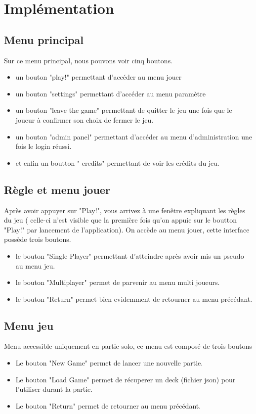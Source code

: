\section{Implémentation}
\subsection{Menu principal}
Sur ce menu principal, nous pouvons voir cinq boutons. 
\begin{itemize}
	\item un bouton "play!" permettant d'accéder au menu jouer
	\item un bouton "settings" permettant d'accéder au menu paramètre
	\item un bouton "leave the game" permettant de quitter le jeu une fois que le joueur à confirmer son choix de 
		fermer le jeu.
	\item un bouton "admin panel" permettant d'accéder au menu d'administration une fois le login réussi.
	\item et enfin un boutton " credits" permettant de voir les crédits du jeu.
\end{itemize}

\subsection{Règle et menu jouer}
Après avoir appuyer sur "Play!", vous arrivez à une fenêtre expliquant les règles du jeu ( celle-ci n'est 
visible que la première fois qu'on appuie sur le boutton "Play!" par lancement de l'application). On accède 
au menu jouer, cette interface possède trois boutons. 
\begin{itemize}
	\item le bouton "Single Player" permettant d'atteindre après avoir mis un pseudo au menu jeu.
	\item le bouton "Multiplayer" permet de parvenir au menu multi joueurs.
	\item le bouton "Return" permet bien evidemment de retourner au menu précédant.
\end{itemize}

\subsection{Menu jeu}
Menu accessible uniquement en partie solo, ce menu est composé de trois boutons 
\begin{itemize}
	\item Le bouton "New Game" permet de lancer une nouvelle partie.
	\item Le bouton "Load Game" permet de récuperer un deck (fichier json) pour l'utiliser durant la partie.
	\item Le bouton "Return" permet de retourner au menu précédant.
\end{itemize}

